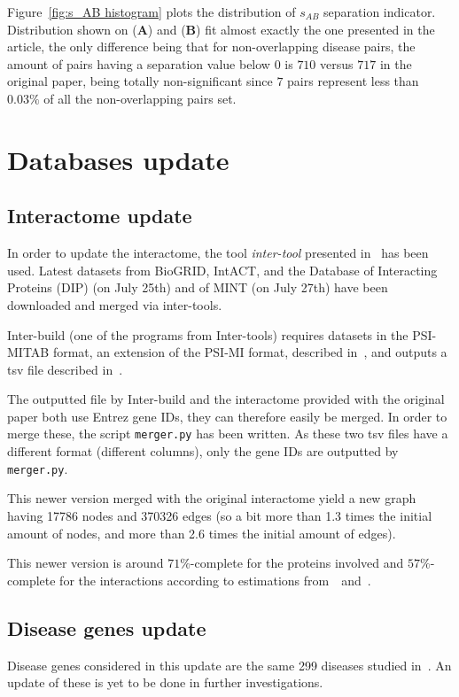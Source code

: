 \documentclass[letterpaper]{article}
\begin{document}
	Figure~\ref{fig:s_AB histogram} plots the distribution of $s_{AB}$ separation indicator.
	Distribution shown on ({\bf A}) and ({\bf B}) fit almost exactly the one presented in the article, the only difference
	being that for non-overlapping disease pairs, the amount of pairs having a separation value below 0 is $710$
	versus $717$ in the original paper, being totally non-significant since $7$ pairs represent less than
	$0.03\%$ of all the non-overlapping pairs set.


\section{Databases update}

	\subsection{Interactome update}
	In order to update the interactome, the tool \textit{inter-tool} presented in~\cite{inter-tools} has
	been used. Latest datasets from BioGRID, IntACT, and the Database of Interacting Proteins (DIP)
	(on July 25th) and of MINT (on July 27th) have been downloaded and merged via inter-tools.

	Inter-build (one of the programs from Inter-tools) requires datasets in the PSI-MITAB format, an extension of the
	PSI-MI format, described in~\cite{MITABFormat}, and outputs a tsv file described in~\cite{inter-tools}.

	The outputted file by Inter-build and the interactome provided with the original paper both use Entrez gene IDs, they
	can therefore easily be merged. In order to merge these, the script \texttt{merger.py} has been written. As these two
	tsv files have a different format (different columns), only the gene IDs are outputted by \texttt{merger.py}.

	This newer version merged with the original interactome yield a new graph having 17786 nodes and 370326 edges
	(so a bit more than 1.3 times the initial amount of nodes, and more than 2.6 times the initial amount of edges).

	This newer version is around $71\%$-complete for the proteins involved and $57\%$-complete for the interactions according
	to estimations from~\cite{estimatingTheSizeOfTheHumanInteractome}~and~\cite{ATruerMeasureOfOurIgnorance}.

	\subsection{Disease genes update}
	Disease genes considered in this update are the same 299 diseases studied in~\cite{originalPaper}. An update of these
	is yet to be done in further investigations.
\end{document}
